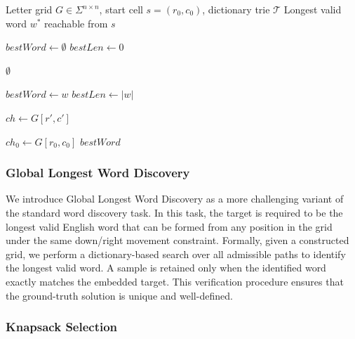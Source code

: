 \begin{algorithm}[t]
\caption{Trie-based verification from a fixed start cell}
\label{alg:verify_longest_word}
\begin{algorithmic}[1]
\Require Letter grid $G \in \Sigma^{n \times n}$, start cell $s=(r_0,c_0)$, dictionary trie $\mathcal{T}$
\Ensure Longest valid word $w^*$ reachable from $s$

\State $\textit{bestWord} \gets \emptyset$
\State $\textit{bestLen} \gets 0$

    \State \Return $\emptyset$
\EndIf

        \State $\textit{bestWord} \gets w$
        \State $\textit{bestLen} \gets |w|$
    \EndIf

            \State $ch \gets G[r',c']$
                \State {}
            \EndIf
        \EndIf
    \EndFor
\EndFunction

\State $ch_0 \gets G[r_0,c_0]$
\State {}
\State \Return $\textit{bestWord}$
\end{algorithmic}
\end{algorithm}

\subsubsection{Global Longest Word Discovery}

We introduce Global Longest Word Discovery as a more challenging variant of the standard word discovery task. In this task, the target is required to be the longest valid English word that can be formed from any position in the grid under the same down/right movement constraint. Formally, given a constructed grid, we perform a dictionary-based search over all admissible paths to identify the longest valid word. A sample is retained only when the identified word exactly matches the embedded target. This verification procedure ensures that the ground-truth solution is unique and well-defined.

\subsubsection{Knapsack Selection}

